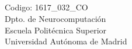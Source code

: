 \chapter*{}

\vspace*{0.2cm}

\begin{center}

\Huge \MakeUppercase{\textbf{\titulo}}

\vspace{7cm}

\Large \autor \\
\Large \tutor \\

\vspace{5cm}


Codigo: 1617\_032\_CO \\
Dpto. de Neurocomputación \\
Escuela Politécnica Superior \\
Universidad Autónoma de Madrid \\
\fecha

\end{center}

\normalsize

\newpage \thispagestyle{empty} %
